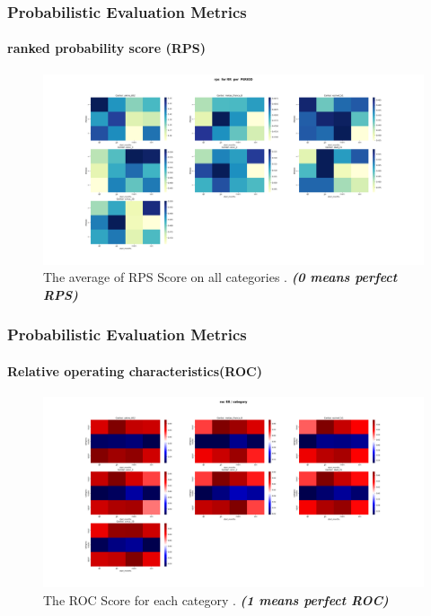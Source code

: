 \begin{frame}
\frametitle{Probabilistic Evaluation Metrics}
\framesubtitle{ranked probability score (RPS)}
\begin{figure}[H]
    \centering
    \includegraphics[scale=0.15]{rps_RR_ PERIOD.png}
    \caption{The average of  RPS Score on all categories    . \textbf{\textit{(0 means perfect RPS)}}}
\end{figure}
\end{frame}







\begin{frame}
\frametitle{Probabilistic Evaluation Metrics}
\framesubtitle{Relative operating characteristics(ROC)}

\begin{figure}[H]
    \centering
    \includegraphics[scale=0.15]{roc_RR_category.png}
    \caption{The ROC Score for each category  . \textbf{\textit{(1 means perfect ROC)}}}
\end{figure}
\end{frame}

